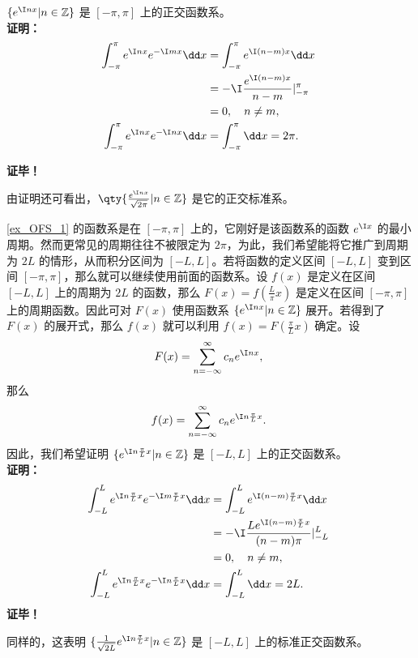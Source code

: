  \begin{example}{}\label{ex_OFS_1}
 $\{e^{\I nx}|n\in\mathbb Z\}$ 是 $[-\pi,\pi]$ 上的正交函数系。\\
 
\textbf{证明：}
\begin{equation}
\begin{aligned}
\int_{-\pi}^\pi e^{\I nx}e^{-\I mx}\dd x&=\int_{-\pi}^\pi e^{\I (n-m)x}\dd x\\&=-\I\frac{e^{\I(n-m)x}}{n-m}{\huge|}_{-\pi}^{\pi}\\
&=0,\quad n\neq m,\\
\int_{-\pi}^\pi e^{\I nx}e^{-\I nx}\dd x&=\int_{-\pi}^\pi \dd x=2\pi.
\end{aligned}~
\end{equation}

\textbf{证毕！}

由证明还可看出，$\qty{\frac{e^{\I nx}}{\sqrt{2\pi}}{\huge|}n\in\mathbb Z}$ 是它的正交标准系。
 \end{example}
 \begin{example}{}\label{ex_OFS_2}
 \autoref{ex_OFS_1} 的函数系是在 $[-\pi,\pi]$ 上的，它刚好是该函数系的函数 $e^{\I x}$ 的最小周期。然而更常见的周期往往不被限定为 $2\pi$，为此，我们希望能将它推广到周期为 $2L$ 的情形，从而积分区间为 $[-L,L]$。若将函数的定义区间 $[-L,L]$ 变到区间 $[-\pi,\pi]$，那么就可以继续使用前面的函数系。设 $f(x)$ 是定义在区间 $[-L,L]$ 上的周期为 $2L$ 的函数，那么 $F(x)=f(\frac{L}{\pi}x)$ 是定义在区间 $[-\pi,\pi]$ 上的周期函数。因此可对 $F(x)$ 使用函数系 $\{e^{\I nx}|n\in\mathbb Z\}$ 展开。若得到了 $F(x)$ 的展开式，那么 $f(x)$ 就可以利用 $f(x)=F(\frac{\pi}{L}x)$ 确定。设 
 \begin{equation}
 F(x)=\sum_{n=-\infty}^\infty c_ne^{\I n x},~
 \end{equation}
 那么
 \begin{equation}\label{eq_OFS_5}
 f(x)=\sum_{n=-\infty}^\infty c_ne^{\I n\frac{\pi}{L} x}.~
 \end{equation}
 因此，我们希望证明 $\{e^{\I n\frac{\pi}{L} x}|n\in\mathbb Z\}$ 是 $[-L,L]$ 上的正交函数系。\\
\textbf{证明：}
\begin{equation}
\begin{aligned}
\int_{-L}^L e^{\I n\frac{\pi}{L}x}e^{-\I m\frac{\pi}{L}x}\dd x&=\int_{-L}^L e^{\I (n-m)\frac{\pi}{L}x}\dd x\\
&=-\I\frac{Le^{\I(n-m)\frac{\pi}{L}x}}{(n-m)\pi}{\huge|}_{-L}^{L}\\
&=0,\quad n\neq m,\\
\int_{-L}^L e^{\I n\frac{\pi}{L}x}e^{-\I n\frac{\pi}{L}x}\dd x&=\int_{-L}^L \dd x=2L.
\end{aligned}~
\end{equation}
\textbf{证毕！}

同样的，这表明 $\{\frac{1}{\sqrt{2L}}e^{\I n\frac{\pi}{L} x}|n\in\mathbb Z\}$ 是 $[-L,L]$ 上的标准正交函数系。
 \end{example}

